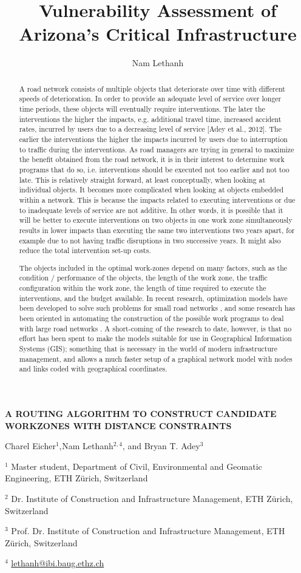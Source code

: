 \documentclass[10pt]{article}
\author{Nam Lethanh}
\title{Vulnerability Assessment of Arizona's Critical Infrastructure}
\begin{document}
\textbf{\uppercase{A ROUTING ALGORITHM TO CONSTRUCT CANDIDATE WORKZONES WITH
DISTANCE CONSTRAINTS}}

Charel Eicher$^{1}$,$^{ }$Nam Lethanh$^{2,4}$, and Bryan T. Adey$^{3}$

$^{1}$ Master student, Department of Civil, Environmental and Geomatic
Engineering, ETH Z\"{u}rich, Switzerland

$^{2}$ Dr. Institute of Construction and Infrastructure Management, ETH
Z\"{u}rich, Switzerland

$^{3}$ Prof. Dr. Institute of Construction and Infrastructure Management, ETH
Z\"{u}rich, Switzerland

$^{4}$ \href{mailto:lethanh@ibi.baug.ethz.ch}{lethanh@ibi.baug.ethz.ch}

\begin{abstract} A road network consists of multiple objects that deteriorate over time with different speeds of deterioration. In order to provide an adequate level of service over longer time periods, these objects will eventually require interventions. The later the interventions the higher the impacts, e.g. additional travel time, increased accident rates, incurred by users due to a decreasing level of service [Adey et al., 2012]. The earlier the interventions the higher the impacts incurred by users due to interruption to traffic during the interventions. As road managers are trying in general to maximize the benefit obtained from the road network, it is in their interest to determine work programs that do so, i.e. interventions should be executed not too earlier and not too late. 
This is relatively straight forward, at least conceptually, when looking at individual objects. It becomes more complicated when looking at objects embedded within a network. This is because the impacts related to executing interventions or due to inadequate levels of service are not additive. In other words, it is possible that it will be better to execute interventions on two objects in one work zone simultaneously results in lower impacts than executing the same two interventions two years apart, for example due to not having traffic disruptions in two successive years. It might also reduce the total intervention set-up costs.

The objects included in the optimal work-zones depend on many factors, such as the condition / performance of the objects, the length of the work zone, the traffic configuration within the work zone, the length of time required to execute the interventions, and the budget available. In recent research, optimization models have been developed to solve such problems for small road networks \citep{Hajdin2007,Lethanh2014b}, and some research has been oriented in automating the construction of the possible work programs to deal with large road networks \citep{Eicher2015}. A short-coming of the research to date, however, is that no effort has been spent to make the models suitable for use in Geographical Information Systems (GIS); something that is necessary in the world of modern infrastructure management, and allows a much faster setup of a graphical network model with nodes and links coded with geographical coordinates. 


\end{abstract}
\end{document}
